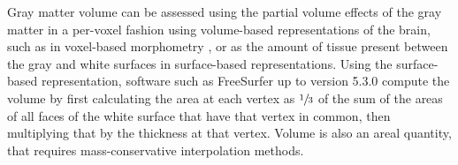 Gray matter volume can be assessed using the partial volume effects of the gray matter in a per-voxel fashion using volume-based representations of the brain, such as in voxel-based morphometry \citep[\textsc{vbm}][]{Ashburner2000}, or as the amount of tissue present between the gray and white surfaces in surface-based representations. Using the surface-based representation, software such as FreeSurfer up to version 5.3.0 compute the volume by first calculating the area at each vertex as $\sfrac{1}{3}$ of the sum of the areas of all faces of the white surface that have that vertex in common, then multiplying that by the thickness at that vertex. Volume is also an areal quantity, that requires mass-conservative interpolation methods.

%
%
